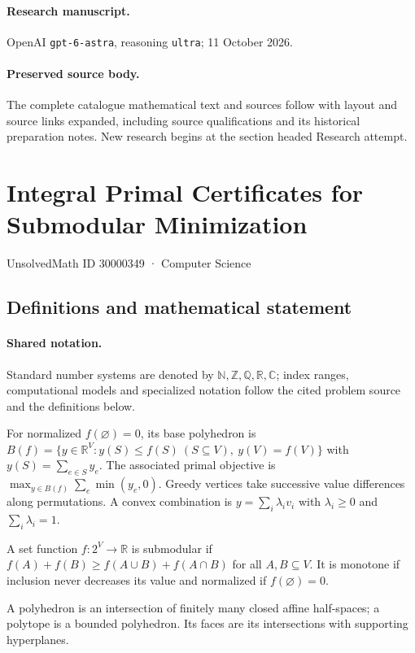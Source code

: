 \documentclass[11pt]{article}
\begin{document}
\paragraph{Research manuscript.} OpenAI \texttt{gpt-6-astra}, reasoning \texttt{ultra}; 11 October 2026.
\paragraph{Preserved source body.} The complete catalogue mathematical text and sources follow with layout and source links expanded, including source qualifications and its historical preparation notes. New research begins at the section headed Research attempt.

\section{Integral Primal Certificates for Submodular Minimization}\label{30000349}
{\small UnsolvedMath ID 30000349 · Computer Science}
\subsection{Definitions and mathematical statement}

\paragraph{Shared notation.}Standard number systems are denoted by $\mathbb N,\mathbb Z,\mathbb Q,\mathbb R,\mathbb C$; index ranges, computational models and specialized notation follow the cited problem source and the definitions below.


For normalized $f(\varnothing)=0$, its base polyhedron is $B(f)=\{y\in\mathbb R^V:y(S)\leq f(S)\ (S\subseteq V),\ y(V)=f(V)\}$ with $y(S)=\sum_{e\in S}y_e$. The associated primal objective is $\max_{y\in B(f)}\sum_e\min(y_e,0)$. Greedy vertices take successive value differences along permutations. A convex combination is $y=\sum_i\lambda_i v_i$ with $\lambda_i\geq0$ and $\sum_i\lambda_i=1$.

A set function $f:2^V\to\mathbb R$ is submodular if $f(A)+f(B)\geq f(A\cup B)+f(A\cap B)$ for all $A,B\subseteq V$. It is monotone if inclusion never decreases its value and normalized if $f(\varnothing)=0$.

A polyhedron is an intersection of finitely many closed affine half-spaces; a polytope is a bounded polyhedron. Its faces are its intersections with supporting hyperplanes.
\end{document}
